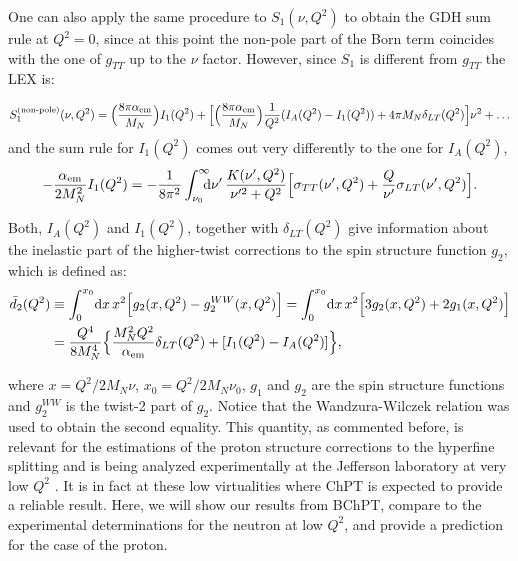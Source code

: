 \documentclass[twocolumn,prc,showpacs,nofootinbib,preprintnumbers,amsmath,amssymb,superscriptaddress]{revtex4-1}
\def\dd{\mathrm{d}}
\begin{document}
One can also apply the same procedure to $S_1(\nu,Q^2)$ to obtain the GDH sum rule at $Q^2=0$, since at this point the non-pole part of the Born term coincides with the one of $g_{TT}$ up to the $\nu$ factor. 
However, since  $S_1$ is different from $g_{TT}$ the LEX is: 
\begin{widetext}
\begin{align}
S_1^{\text{(non-pole)}}(\nu,Q^2) =  \Big( \frac{8\pi\alpha_{\rm em}}{M_N} \Big)  I_1(Q^2) + \Big[ \Big(\frac{8\pi \alpha_{\rm em}}{M_N} \Big) \frac{1}{Q^2} (I_A(Q^2) - I_1(Q^2)) + 4\pi M_N \delta_{LT}(Q^2) \Big]\nu^2 + \dots\label{Eq:LEX-S1np}
\end{align}
and the sum rule for $I_1(Q^2)$ comes out very differently to the one for $I_A(Q^2)$,
\begin{align}
-\frac{\alpha_{\rm em}}{2 M_N^2}I_1(Q^2) = -\frac{1}{8 \pi^2} \int_{\nu_0}^\infty \!\!\!\! \dd\nu'\, \frac{K(\nu',Q^2)}{\nu'^2+Q^2} \Big[ \sigma_{TT} (\nu',Q^2) + \frac{Q}{\nu'} \sigma_{LT} (\nu',Q^2)\Big]. \label{Eq:I1-SumRule}
\end{align}

Both, $I_A(Q^2)$ and $I_1(Q^2)$, together with $\delta_{LT}(Q^2)$ give information about the inelastic part of the higher-twist corrections to the spin structure function $g_2$, which is defined as: 
\begin{align}\label{Eq:d2inelDef}
 \bar{d}_2(Q^2) & \equiv \int_0^{x_0}\! \dd x \, x^2\Big[ g_2(x,Q^2) - g_2^{WW}(x,Q^2) \Big] = \int_0^{x_0}\! \dd x \, x^2\Big[ 3 g_2(x,Q^2) + 2 g_1(x,Q^2) \Big] \nonumber\\
 &= \frac{Q^4}{8 M_N^4}\Big\{ \frac{M_N^2 Q^2}{\alpha_{\rm em}}\delta_{LT}(Q^2) +[I_1(Q^2) - I_A(Q^2)] \Big\},
\end{align}
\end{widetext}
where $x=Q^2/2M_N \nu$, $x_0=Q^2/2M_N \nu_0$, $g_1$ and $g_2$ are the spin structure functions and $g_2^{WW}$ is the twist-2 part of $g_2$.
Notice that the Wandzura-Wilczek relation \cite{Wandzura:1977qf} was used to obtain the second equality.
This quantity, as commented before, is relevant for the estimations of the proton structure corrections to the hyperfine splitting and is being analyzed experimentally at the Jefferson laboratory at very low $Q^2$ \cite{Exp-new-E08-027,Exp-new-E97-110}.
It is in fact at these low virtualities where ChPT is expected to provide a reliable result.
Here, we will show our results from BChPT, compare to the experimental determinations for the neutron at low $Q^2$, and provide a prediction for the case of the proton. 
\end{document}
